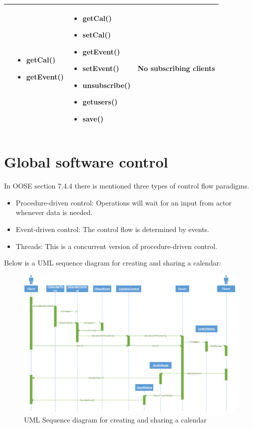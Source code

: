 \begin{tabular}{|p{2.9cm}|p{3.6cm}|p{3.6cm}|p{3.6cm}|}
& 
\begin{itemize}
\item getCal()
\item getEvent()
\end{itemize} 
& 
\begin{itemize}
\item getCal()
\item setCal() 
\item getEvent()
\item setEvent()
\item unsubscribe()
\item getusers()
\item save()
\end{itemize}
&
No subscribing clients
 \\ \hline
\end{tabular}

\newpage
\section*{Global software control}

In OOSE section 7.4.4 there is mentioned three types of control flow paradigms. 

\begin{itemize}
	\item Procedure-driven control: Operations will wait for an input from actor whenever data is needed. 
	\item Event-driven control: The control flow is determined by events.
	\item Threads: This is a concurrent version of procedure-driven control.
\end{itemize}

 Below is a UML sequence diagram for creating and sharing a calendar:

\begin{figure}[ht!]
\centering
\includegraphics[width=160mm]{UMLSequenceCalendar.png}
\caption{UML Sequence diagram for creating and sharing a calendar \label{overflow}}
\end{figure}

